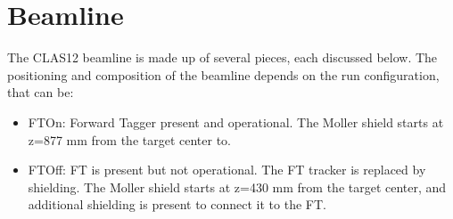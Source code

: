 \section{Beamline}

The CLAS12 beamline is made up of several pieces, each discussed below. The positioning and composition of the beamline
depends on the run configuration, that can be:

\begin{itemize}
	\item FTOn: Forward Tagger present and operational. The Moller shield starts at z=877 mm from the target center to.
	\item FTOff: FT is present but not operational. The FT tracker is replaced by shielding.
                 The Moller shield starts at z=430 mm from the target center, and additional shielding is present to connect it to the FT.
\end{itemize}


